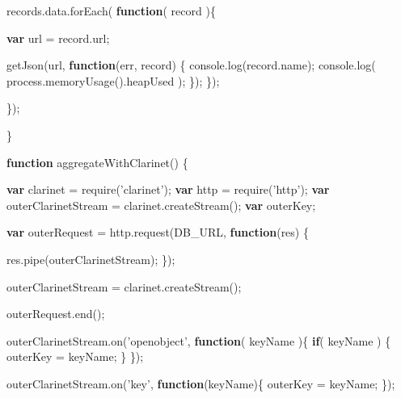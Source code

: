 \documentclass[12pt, ]{article}
\newenvironment{Shaded}{}{}
\newcommand{\KeywordTok}[1]{\textcolor[rgb]{0.00,0.44,0.13}{\textbf{{#1}}}}
\newcommand{\StringTok}[1]{\textcolor[rgb]{0.25,0.44,0.63}{{#1}}}
\newcommand{\OtherTok}[1]{\textcolor[rgb]{0.00,0.44,0.13}{{#1}}}
\newcommand{\FunctionTok}[1]{\textcolor[rgb]{0.02,0.16,0.49}{{#1}}}
\newcommand{\NormalTok}[1]{{#1}}
\begin{document}
\begin{Shaded}
\begin{Highlighting}[]
      \OtherTok{records}\NormalTok{.}\OtherTok{data}\NormalTok{.}\FunctionTok{forEach}\NormalTok{( }\KeywordTok{function}\NormalTok{( record )\{}
       
         \KeywordTok{var} \NormalTok{url = }\OtherTok{record}\NormalTok{.}\FunctionTok{url}\NormalTok{;}
         
         \FunctionTok{getJson}\NormalTok{(url, }\KeywordTok{function}\NormalTok{(err, record) \{}
            \OtherTok{console}\NormalTok{.}\FunctionTok{log}\NormalTok{(}\OtherTok{record}\NormalTok{.}\FunctionTok{name}\NormalTok{);}
            \OtherTok{console}\NormalTok{.}\FunctionTok{log}\NormalTok{( }\OtherTok{process}\NormalTok{.}\FunctionTok{memoryUsage}\NormalTok{().}\FunctionTok{heapUsed} \NormalTok{);}
         \NormalTok{\});}
      \NormalTok{\});}

   \NormalTok{\});   }

\NormalTok{\}}


\KeywordTok{function} \FunctionTok{aggregateWithClarinet}\NormalTok{() \{}

   \KeywordTok{var} \NormalTok{clarinet = }\FunctionTok{require}\NormalTok{(}\StringTok{'clarinet'}\NormalTok{);   }
   \KeywordTok{var} \NormalTok{http = }\FunctionTok{require}\NormalTok{(}\StringTok{'http'}\NormalTok{);}
   \KeywordTok{var} \NormalTok{outerClarinetStream = }\OtherTok{clarinet}\NormalTok{.}\FunctionTok{createStream}\NormalTok{();}
   \KeywordTok{var} \NormalTok{outerKey;}
   
   \KeywordTok{var} \NormalTok{outerRequest = }\OtherTok{http}\NormalTok{.}\FunctionTok{request}\NormalTok{(DB_URL, }\KeywordTok{function}\NormalTok{(res) \{}
                              
      \OtherTok{res}\NormalTok{.}\FunctionTok{pipe}\NormalTok{(outerClarinetStream);}
   \NormalTok{\});}
   
   \NormalTok{outerClarinetStream = }\OtherTok{clarinet}\NormalTok{.}\FunctionTok{createStream}\NormalTok{();}
      
   \OtherTok{outerRequest}\NormalTok{.}\FunctionTok{end}\NormalTok{();}
      
   \OtherTok{outerClarinetStream}\NormalTok{.}\FunctionTok{on}\NormalTok{(}\StringTok{'openobject'}\NormalTok{, }\KeywordTok{function}\NormalTok{( keyName )\{      }
      \KeywordTok{if}\NormalTok{( keyName ) \{}
         \NormalTok{outerKey = keyName;      }
      \NormalTok{\}}
   \NormalTok{\});}
   
   \OtherTok{outerClarinetStream}\NormalTok{.}\FunctionTok{on}\NormalTok{(}\StringTok{'key'}\NormalTok{, }\KeywordTok{function}\NormalTok{(keyName)\{}
      \NormalTok{outerKey = keyName;}
   \NormalTok{\});}
   

\end{Highlighting}
\end{Shaded}
\end{document}
